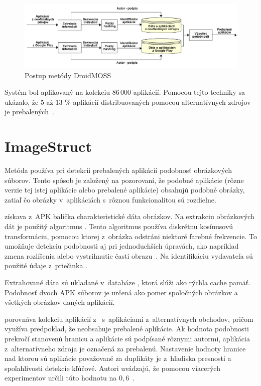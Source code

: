 \begin{figure}[htb]
  \begin{center}
    \includegraphics[width=130mm]{images/DroidMoss.png}
  \end{center}
  \caption{Postup metódy DroidMOSS}
  \label{fig:strukturaDroidMoss}
\end{figure}


Systém  bol aplikovaný na kolekciu $86\,000$ aplikácií. Pomocou tejto techniky sa ukázalo, že $5$ až $13$ \% aplikácií distribuovaných pomocou alternatívnych zdrojov je prebalených~\cite{DetectingRepackagedZhou}.


\section{ImageStruct}

Metóda  používa pri detekcii prebalených aplikácií podobnosť obrázkových súborov. Tento spôsob je založený na pozorovaní, že podobné aplikácie (rôzne verzie tej istej aplikácie alebo prebalené aplikácie) obsahujú podobné obrázky, zatiaľ čo obrázky v~aplikáciách s~rôznou funkcionalitou sú rozdielne. 

 získava z~APK balíčka charakteristické dáta obrázkov. Na extrakciu obrázkových dát je použitý algoritmus . Tento algoritmus používa diskrétnu kosínusovú transformáciu, pomocou ktorej z~obrázka odstráni niektoré farebné frekvencie. To umožňuje detekciu podobnosti aj pri jednoduchších úpravách, ako napríklad zmena rozlíšenia alebo vystrihnutie časti obrazu~\cite{pHash}. Na identifikáciu vydavateľa sú použité údaje z~priečinka .


Extrahované dáta sú ukladané v~databáze , ktorá slúži ako rýchla cache pamäť. 
Podobnosť dvoch APK súborov je určená ako pomer spoločných obrázkov a všetkých obrázkov daných aplikácií.

  porovnáva kolekciu aplikácií z~ s~aplikáciami z~alternatívnych obchodov, pričom využíva predpoklad, že  neobsahuje prebalené aplikácie. Ak hodnota podobnosti prekročí stanovenú hranicu a aplikácie sú podpísané rôznymi autormi, aplikácia z~alternatívneho zdroja je označená za prebalenú.
Nastavenie hodnoty hranice nad ktorou sú aplikácie považované za duplikáty je z~hľadiska presnosti a spoľahlivosti detekcie kľúčové. Autori uvádzajú, že pomocou viacerých experimentov určili túto hodnotu na $0,6$~\cite{ImageStruct}.

